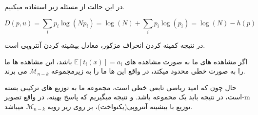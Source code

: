 در این حالت از مسئله زیر استفاده میکنیم.

$$
D(p, u)=\sum_i p_i\log(Np_i) = \log(N) + \sum_{i} p_i\log(p_i) = \log(N) - h(p)
$$

در نتیجه کمینه کردن انحراف مزکور، معادل بیشینه کردن آنتروپی است.

اگر مشاهده های ما به صورت مشاهده های $\mathbb{E}[t_i(x)]=a_i$ باشد، این مشاهده ها ما را به صورت خطی محدود میکند، در واقع این ها ما را به زیرمجموعه $\mathcal{M}_{n-k}$ می برند.

حال چون که امید ریاضی تابعی خطی است، مجموعه ما به توزیع های ترکیبی بسته است، در نتیجه باید یک محموعه  باشد. و نتیجه میگیریم که پاسخ بهینه، در واقع تصویر-m توزیع با بیشینه آنتروپی(یکنواخت)، بر روی زیر رویه $\mathcal{M}_{n-k}$ میباشد.